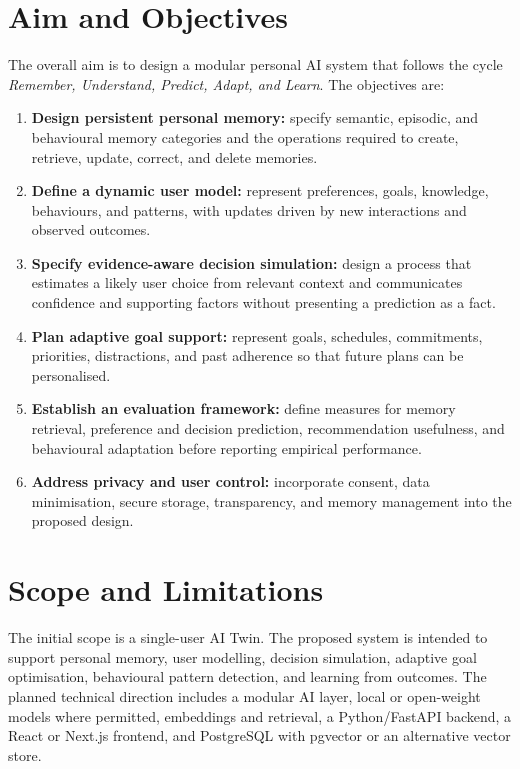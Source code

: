 \documentclass{tietreport}
\begin{document}
\section{Aim and Objectives}
The overall aim is to design a modular personal AI system that follows the cycle \textit{Remember, Understand, Predict, Adapt, and Learn}. The objectives are:
\begin{enumerate}[leftmargin=*]
  \item \textbf{Design persistent personal memory:} specify semantic, episodic, and behavioural memory categories and the operations required to create, retrieve, update, correct, and delete memories.
  \item \textbf{Define a dynamic user model:} represent preferences, goals, knowledge, behaviours, and patterns, with updates driven by new interactions and observed outcomes.
  \item \textbf{Specify evidence-aware decision simulation:} design a process that estimates a likely user choice from relevant context and communicates confidence and supporting factors without presenting a prediction as a fact.
  \item \textbf{Plan adaptive goal support:} represent goals, schedules, commitments, priorities, distractions, and past adherence so that future plans can be personalised.
  \item \textbf{Establish an evaluation framework:} define measures for memory retrieval, preference and decision prediction, recommendation usefulness, and behavioural adaptation before reporting empirical performance.
  \item \textbf{Address privacy and user control:} incorporate consent, data minimisation, secure storage, transparency, and memory management into the proposed design.
\end{enumerate}

\clearpage
{}
\section{Scope and Limitations}
The initial scope is a single-user AI Twin. The proposed system is intended to support personal memory, user modelling, decision simulation, adaptive goal optimisation, behavioural pattern detection, and learning from outcomes. The planned technical direction includes a modular AI layer, local or open-weight models where permitted, embeddings and retrieval, a Python/FastAPI backend, a React or Next.js frontend, and PostgreSQL with pgvector or an alternative vector store.
\end{document}
